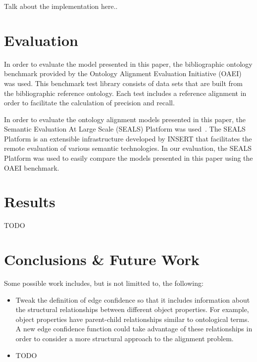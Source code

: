 \documentclass[letterpaper,twocolumn,12pt]{article}
\begin{document}
Talk about the implementation here..

\section{Evaluation}
\label{sec:eval}

In order to evaluate the model presented in this paper, the bibliographic ontology benchmark provided by the Ontology Alignment Evaluation Initiative (OAEI) was used.
This benchmark test library consists of data sets that are built from the bibliographic reference ontology.
Each test includes a reference alignment in order to facilitate the calculation of precision and recall.

In order to evaluate the ontology alignment models presented in this paper, the Semantic Evaluation At Large Scale (SEALS) Platform was used~\cite{esteban:2010:executing, wrigley:2010:evaluating}.
The SEALS Platform is an extensible infrastructure developed by INSERT that facilitates the remote evaluation of various semantic technologies.
In our evaluation, the SEALS Platform was used to easily compare the models presented in this paper using the OAEI benchmark.

\section{Results}
\label{sec:results}

\begin{figure*}

\end{figure*}

TODO

\section{Conclusions \& Future Work}
\label{sec:conclusions}


Some possible work includes, but is not limitted to, the following:

\begin{itemize}
\item Tweak the definition of edge confidence so that it includes information about the structural relationships between different object properties.
For example, object properties have parent-child relationships similar to ontological terms.
A new edge confidence function could take advantage of these relationships in order to consider a more structural approach to the alignment problem.
\item TODO
\end{itemize}
\end{document}
